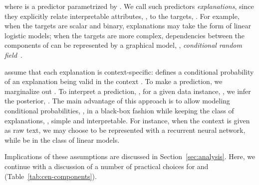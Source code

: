 \documentclass[twoside,11pt]{article}
\begin{document}
where  is a predictor parametrized by .
We call such predictors \emph{explanations}, since they explicitly relate interpretable attributes, , to the targets, .
For example, when the targets are scalar and binary, explanations may take the form of linear logistic models;
when the targets are more complex, dependencies between the components of  can be represented by a graphical model, \eg, \emph{conditional random field}~\citep{lafferty2001crf}.

{\CENs} assume that each explanation is context-specific:  defines a conditional probability of an explanation  being valid in the context .
To make a prediction, we marginalize out .
To interpret a prediction, , for a given data instance, , we infer the posterior, .
The main advantage of this approach is to allow modeling conditional probabilities, , in a black-box fashion while keeping the class of explanations, , simple and interpretable.
For instance, when the context is given as raw text, we may choose  to be represented with a recurrent neural network, while  be in the class of linear models.

Implications of these assumptions are discussed in Section~\ref{sec:analysis}.
Here, we continue with a discussion of a number of practical choices for  and  (Table~\ref{tab:cen-components}).
\end{document}
